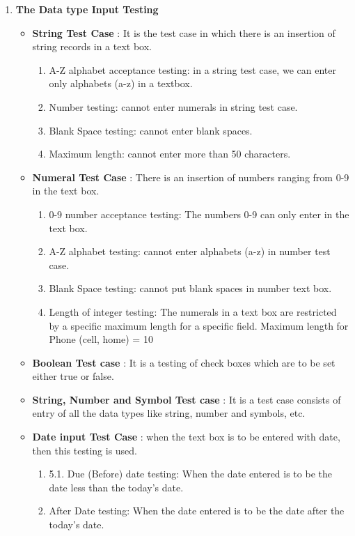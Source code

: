 \begin{enumerate}
\item \textbf{The Data type Input Testing} 
\begin{itemize}
  \item \textbf{String Test Case} : It is the test case in which there is an insertion of string records in a text box.
    \begin{enumerate}
      \item A-Z alphabet acceptance testing: in a string test case, we can enter only alphabets (a-z) in a textbox. 
      \item Number testing: cannot enter numerals in string test case. 
      \item Blank Space testing: cannot enter blank spaces. 
      \item Maximum length: cannot enter more than 50 characters.
    \end{enumerate}
  \item \textbf{Numeral Test Case} : There is an insertion of numbers ranging from 0-9 in the text box.
    \begin{enumerate}
      \item 0-9 number acceptance testing: The numbers 0-9 can only enter in the text box. 
      \item A-Z alphabet testing: cannot enter alphabets (a-z) in number test case. 
      \item Blank Space testing: cannot put blank spaces in number text box. 
      \item Length of integer testing: The numerals in a text box are restricted by a specific maximum length for a specific field. Maximum length for Phone (cell, home) = 10
    \end{enumerate}
  \item \textbf{Boolean Test case} : It is a testing of check boxes which are to be set either true or false.
  \item \textbf{String, Number and Symbol Test case} : It is a test case consists of entry of all the data types like string, number and symbols, etc.
  \item \textbf{Date input Test Case} : when the text box is to be entered with date, then this testing is used.
    \begin{enumerate}
      \item 5.1. Due (Before) date testing: When the date entered is to be the date less than the today’s date. 
      \item After Date testing: When the date entered is to be the date after the today’s date. 

\end{enumerate}
\end{itemize}
\end{enumerate}
